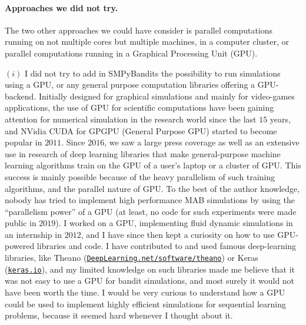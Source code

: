
\paragraph{Approaches we did not try.}
%
The two other approaches we could have consider is parallel computations running on not multiple cores but multiple machines, in a computer cluster, or parallel computations running in a Graphical Processing Unit (GPU).

$(i)$ I did not try to add in SMPyBandits the possibility to run simulations using a GPU, or any general purpose computation libraries offering a GPU-backend.
Initially designed for graphical simulations and mainly for video-games applications, the use of GPU for scientific computations have been gaining attention for numerical simulation in the research world since the last $15$ years, and NVidia CUDA for GPGPU (General Purpose GPU) started to become popular in $2011$.
Since $2016$, we saw a large press coverage as well as an extensive use in research of deep learning libraries that make general-purpose machine learning algorithms train on the GPU of a user's laptop or a cluster of GPU.
This success is mainly possible because of the heavy parallelism of such training algorithms, and the parallel nature of GPU.
To the best of the author knowledge, nobody has tried to implement high performance MAB simulations by using the ``parallelism power'' of a GPU (at least, no code for such experiments were made public in $2019$).
I worked on a GPU, implementing fluid dynamic simulations in an internship in $2012$, and I have since then kept a curiosity on how to use GPU-powered libraries and code.
I have contributed to and used famous deep-learning libraries, like Theano (\href{http://deeplearning.net/software/theano/}{\texttt{DeepLearning.net/software/theano}}) or Keras (\href{https://keras.io/}{\texttt{keras.io}}), and my limited knowledge on such libraries made me believe that it was not easy to use a GPU for bandit simulations, and most surely it would not have been worth the time.
I would be very curious to understand how a GPU could be used to implement highly efficient simulations for sequential learning problems, because it seemed hard whenever I thought about it.


